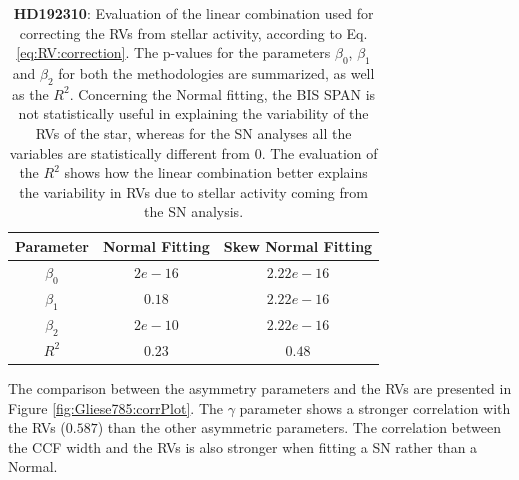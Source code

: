 \documentclass[11pt, oneside]{article}
\begin{document}
\begin{table}[!t]
\begin{tabular}{|c|c|c|}
\hline
Parameter          & Normal Fitting         &   Skew Normal Fitting \\
\hline
$\beta_{0}$            &    $2e-16$    & $2.22e-16$ \\
\hline
$\beta_{1}$            &    $0.18$    & $2.22e-16$ \\
\hline
$\beta_{2}$            &     $2e-10$   &  $2.22e-16$ \\
\hline
$R^{2}$      &     $0.23$    &  $0.48$   \\
\hline
\end{tabular}
\caption{\textbf{HD192310}: Evaluation of the linear combination used for correcting the RVs from stellar activity, according to Eq. \ref{eq:RV:correction}. The p-values for the parameters  $\beta_{0}$, $\beta_{1}$ and $\beta_{2}$ for both the methodologies are summarized, as well as the $R^2$. Concerning the Normal fitting, the BIS SPAN is not statistically useful in explaining the variability of the RVs of the star, whereas for the SN analyses all the variables are statistically different from $0$. The evaluation of the $R^2$ shows how the linear combination better explains the variability in RVs due to stellar activity coming from the SN analysis.}
\label{table:Gliese785:test}
\end{table}

The comparison between the asymmetry parameters and the RVs are presented in Figure \ref{fig:Gliese785:corrPlot}. The $\gamma$ parameter shows a stronger correlation with the RVs ($0.587$) than the other asymmetric parameters. The correlation between the CCF width and the RVs is also stronger when fitting a SN rather than a Normal.
\fi
\end{document}

